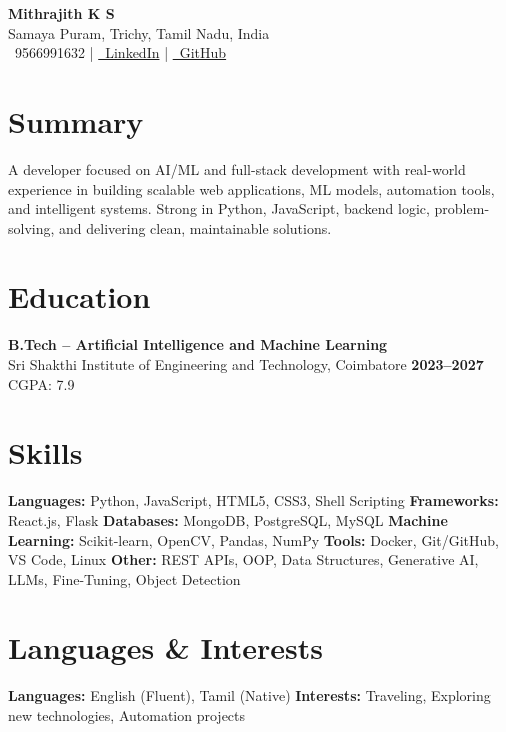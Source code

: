\documentclass[a4paper,12pt]{article}
\begin{document}
\begin{center}
    {\Huge \textbf{\textcolor{accent}{Mithrajith K S}}} \\[2pt]
    Samaya Puram, Trichy, Tamil Nadu, India \\[4pt]
    \faPhone\ 9566991632 \quad | \quad
    \href{https://www.linkedin.com/in/mithrajitks046}{\faLinkedin\ LinkedIn} \quad | \quad
    \href{https://github.com/mithrajith46}{\faGithub\ GitHub}
\end{center}

\section*{Summary}
A developer focused on AI/ML and full-stack development with real-world experience in building scalable web applications, ML models, automation tools, and intelligent systems. Strong in Python, JavaScript, backend logic, problem-solving, and delivering clean, maintainable solutions.

\section*{Education}
\textbf{B.Tech – Artificial Intelligence and Machine Learning} \\
Sri Shakthi Institute of Engineering and Technology, Coimbatore  
\hfill \textbf{2023–2027} \\
CGPA: 7.9

\section*{Skills}
\textbf{Languages:} Python, JavaScript, HTML5, CSS3, Shell Scripting  
\textbf{Frameworks:} React.js, Flask  
\textbf{Databases:} MongoDB, PostgreSQL, MySQL  
\textbf{Machine Learning:} Scikit-learn, OpenCV, Pandas, NumPy  
\textbf{Tools:} Docker, Git/GitHub, VS Code, Linux  
\textbf{Other:} REST APIs, OOP, Data Structures, Generative AI, LLMs, Fine-Tuning, Object Detection

\section*{Languages \& Interests}
\textbf{Languages:} English (Fluent), Tamil (Native)  
\textbf{Interests:} Traveling, Exploring new technologies, Automation projects
\end{document}
